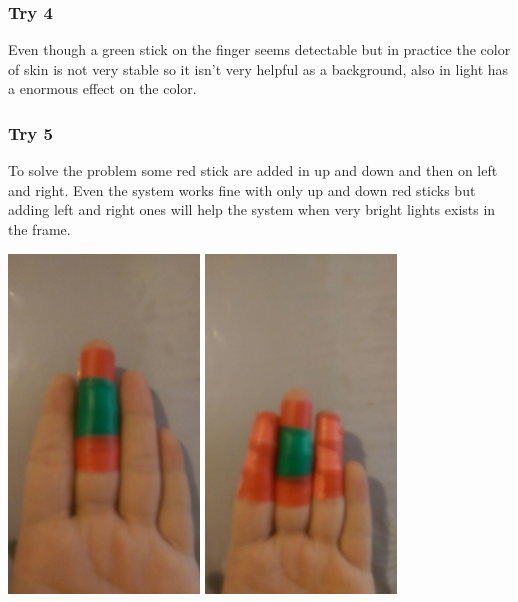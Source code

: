 \documentclass{report}
\begin{document}
\subsubsection{Try 4}
Even though a green stick on the finger seems detectable but in practice the color of skin is not very stable so it isn't very helpful as a background, also in light has a enormous effect on the color.
\subsubsection{Try 5}
To solve the problem some red stick are added in up and down and then on left and right. Even the system works fine with only  up and down red sticks but adding left and right ones will help the system when very bright lights exists in the frame.
\begin{center}
	\includegraphics[width=2in]{Object4.jpg}
	\includegraphics[width=2in]{Object5.jpg}
\end{center}
\end{document}
